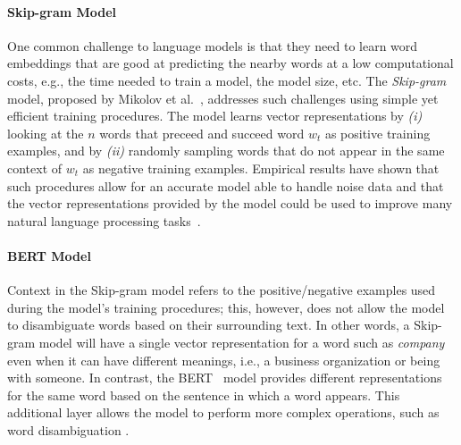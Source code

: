 \paragraph{\textbf{Skip-gram Model}}
\label{cp5:skip-gram}

One common challenge to language models is that they need to learn word embeddings that are good at predicting the nearby words at a low computational costs, e.g., the time needed to train a model, the model size, etc.
The \textit{Skip-gram} model, proposed by Mikolov et al.~\cite{Mikolov2013}, addresses such challenges using simple yet efficient training procedures. 
The model learns vector representations by \textit{(i)} looking at the $n$ words that preceed and succeed word $w_t$
as positive training examples, and by \textit{(ii)} randomly sampling words that do not appear in the same context of $w_t$ as negative training examples. 
Empirical results have shown that such procedures allow for an accurate model able to handle noise data and that 
the vector representations provided by the model could be used to improve many natural language processing tasks~\cite{mikolov2013efficient}.






\paragraph{\textbf{BERT Model}}
\label{cp5:bert}

Context in the Skip-gram model refers to the positive/negative examples used during the model's training procedures; this, however, does not allow the model to disambiguate words based on their surrounding text. In other words, a Skip-gram model will have a single vector representation for a word such as \textit{company} even when it can have different meanings, i.e., a business organization or being with someone. In contrast, 
the \acf{BERT}~\cite{Devlin2018Bert} model provides different representations for the same word based on the sentence in which a word appears.
This additional layer allows the model to perform more complex operations, such as word disambiguation .


